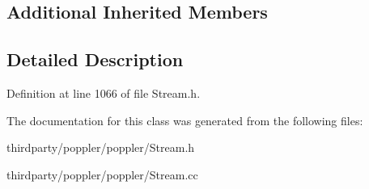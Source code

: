\subsection*{Additional Inherited Members}


\subsection{Detailed Description}


Definition at line 1066 of file Stream.\+h.



The documentation for this class was generated from the following files\+:\begin{DoxyCompactItemize}
\item 
thirdparty/poppler/poppler/Stream.\+h\item 
thirdparty/poppler/poppler/Stream.\+cc\end{DoxyCompactItemize}
